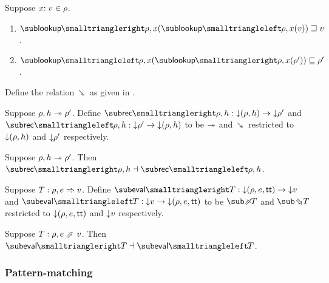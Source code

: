 \begin{lemma}
\label{lem:core-language:env-get-put}Suppose $x{:}\;v\in{\rho}$.
\begin{enumerate}
   \item \label{lem:core-language:env-get-put:1} $\envLookupFwdF{\rho,x}(\envLookupBwdF{\rho,x}(v)) \geq v$.
   \item \label{lem:core-language:env-get-put:2} $\envLookupBwdF{\rho,x}(\envLookupFwdF{\rho,x}(\rho')) \leq \rho'$.
\end{enumerate}
\end{lemma}

\begin{definition}
   \label{def:core-language:closeDefs-bwd}
   Define the relation $\closeDefsBwdR$ as given in .
\end{definition}

\begin{definition}
   Suppose $\rho, h \twoheadrightarrow \rho'$. Define $\closeDefsFwdF{\rho,h}: \Below{(\rho, h)} \to \Below{\rho'}$ and $\closeDefsBwdF{\rho,h}: \Below{\rho'} \to \Below{(\rho, h)}$ to be $\twoheadrightarrow$ and $\closeDefsBwdR$ restricted to ${\downarrow}{(\rho, h)}$ and ${\downarrow}{\rho'}$ respectively.
\end{definition}

\begin{theorem}
\label{thm:core-language:closeDefs:gc}
   Suppose $\rho, h \twoheadrightarrow \rho'$.  Then $\closeDefsFwdF{\rho,h} \adjoint \closeDefsBwdF{\rho,h}$.
\end{theorem}

\begin{definition}
   Suppose $T: \rho, e \Rightarrow v$. Define $\evalFwdF{T}: \Below{(\rho, e, \TT)} \to \Below{v}$ and $\evalBwdF{T}: \Below{v} \to \Below{(\rho, e, \TT)}$ to be $\evalFwdR{T}$ and $\evalBwdR{T}$ restricted to ${\downarrow}{(\rho, e, \mathsf{tt})}$ and ${\downarrow}{v}$ respectively.
\end{definition}

\begin{theorem}
\label{thm:core-language:eval:gc}
   Suppose $T: \rho, e \evalFwdS v$.  Then $\evalFwdF{T} \adjoint \evalBwdF{T}$.
\end{theorem}

\subsubsection{Pattern-matching}

